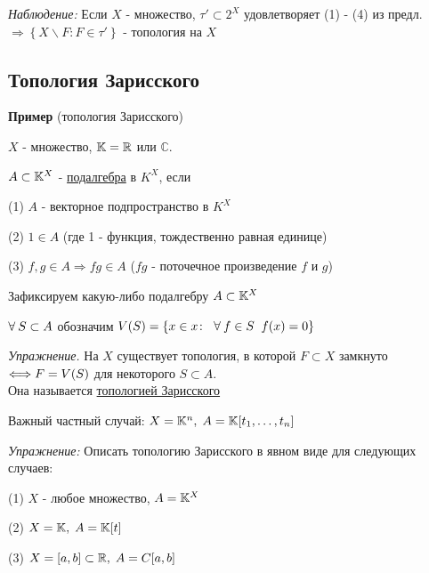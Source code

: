 \documentclass[../../main.tex]{subfiles}
\begin{document}
\textit{Наблюдение:} Если $X$ - множество, $\tau' \subset 2^X$ удовлетворяет (1) - (4) из предл. $\Rightarrow \left\{X \backslash F \colon F \in \tau' \right\}$ - топология на $X$

\subsection{Топология Зарисского}

\textbf{Пример} (топология Зарисского)

$X$ - множество, $\mathbb{K} = \mathbb{R}$ или $\mathbb{C}$.

 $A \subset \mathbb{K}^X$ - \underline{подалгебра} в $K^X$, если

(1) $A$ - векторное подпространство в $K^X$

(2) $1 \in A$ (где 1 - функция, тождественно равная единице)

(3) $f, g \in A \Rightarrow fg \in A$ ($fg$ - поточечное произведение $f$ и $g$)

Зафиксируем какую-либо подалгебру $A \subset \mathbb{K}^X$

$\forall\: S \subset A$ обозначим $V(S) = \left\{ x \in x \colon\;\; \forall\: f \in S \;\; f(x) = 0 \right\}$ 

\textit{Упражнение.} На $X$ существует топология, в которой $F \subset X$ замкнуто $\Longleftrightarrow  F = V(S)$ для некоторого $S \subset A$. \\Она называется \underline{топологией Зарисского}

Важный частный случай: $X = \mathbb{K}^n,\; A = \mathbb{K}[t_1,\ldots, t_n]$

\textit{Упражнение:} Описать топологию Зарисского в явном виде для следующих случаев:

(1) $X$ - любое множество, $A = \mathbb{K}^X$

(2) $X = \mathbb{K}, \; A = \mathbb{K}[t]$

(3) $X = [a, b] \subset \mathbb{R}, \; A = C[a,b]$
\end{document}
